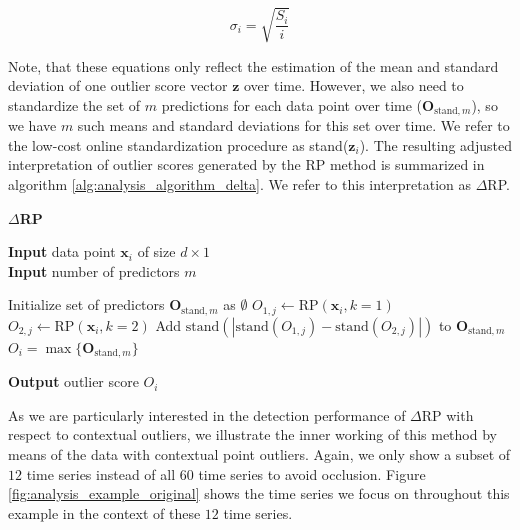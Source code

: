 \begin{equation}\label{eq:analysis_online_std}
	\sigma_i = \sqrt{\frac{S_{i}}{i}}
\end{equation}

Note, that these equations only reflect the estimation of the mean and standard deviation of one outlier score vector $\mathbf{z}$ over time. However, we also need to standardize the set of $m$ predictions for each data point over time ($\mathbf{O}_{\text{stand},m}$), so we have $m$ such means and standard deviations for this set over time. We refer to the low-cost online standardization procedure as stand($\mathbf{z}_i$). The resulting adjusted interpretation of outlier scores generated by the RP method is summarized in algorithm \ref{alg:analysis_algorithm_delta}. We refer to this interpretation as $\Delta$RP.

\vspace{-0.2cm}	
\begin{algorithm}[H]
	\caption{\quad \textbf{$\Delta$RP}}
	\label{alg:analysis_algorithm_delta}
	\begin{flushleft}
	\vspace{-0.2cm}
	\textbf{Input} data point $\mathbf{x}_i$ of size $d \times 1$\\
	\textbf{Input} number of predictors $m$	
	\vspace{-0.1cm}
	\end{flushleft}
	\begin{algorithmic}[1]	
		\vspace{-0.2cm}
		\STATE Initialize set of predictors $\mathbf{O}_{\text{stand},m}$ as $\emptyset$
		\FOR{$j$ in $m$ predictors}
			\STATE $O_{1,j} \gets \text{RP}(\mathbf{x}_i, k=1)$
			\STATE $O_{2,j} \gets \text{RP}(\mathbf{x}_i, k=2)$
			\STATE Add $\text{stand}(|\text{stand}(O_{1,j}) - \text{stand}(O_{2,j})|)$ to $\mathbf{O}_{\text{stand},m}$
		\ENDFOR
		\STATE $O_i = \max \{\mathbf{O}_{\text{stand},m}\}$
	\end{algorithmic}
	\begin{flushleft}
	\vspace{-0.3cm}
	\textbf{Output} outlier score $O_i$
	\vspace{-0.3cm}
	\end{flushleft}
\end{algorithm}
\vspace{-0.2cm}

As we are particularly interested in the detection performance of $\Delta$RP with respect to contextual outliers, we illustrate the inner working of this method by means of the data with contextual point outliers. Again, we only show a subset of $12$ time series instead of all $60$ time series to avoid occlusion. Figure \ref{fig:analysis_example_original} shows the time series we focus on throughout this example in the context of these $12$ time series.

